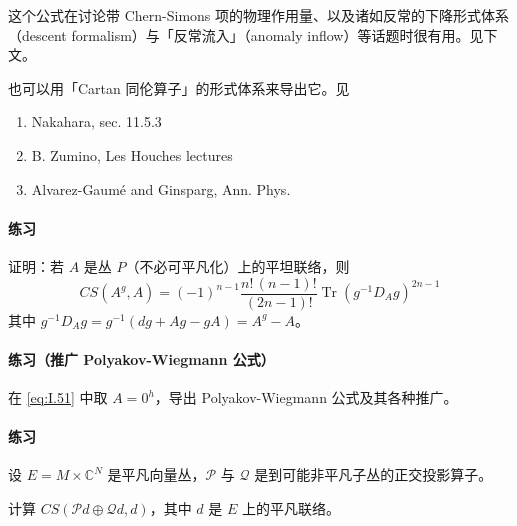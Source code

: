 
这个公式在讨论带 Chern-Simons 项的物理作用量、以及诸如反常的下降形式体系（descent formalism）与「反常流入」（anomaly inflow）等话题时很有用。见下文。

也可以用「Cartan 同伦算子」的形式体系来导出它。见

\begin{enumerate}
  \item Nakahara, sec. 11.5.3
  \item B. Zumino, Les Houches lectures
  \item Alvarez-Gaum\'e and Ginsparg, Ann. Phys.
\end{enumerate}

\paragraph{练习}
证明：若 $A$ 是丛 $P$（不必可平凡化）上的平坦联络，则
\begin{equation}
  CS(A^g,A) = (-1)^{n-1}\frac{n!\,(n-1)!}{(2n-1)!}\operatorname{Tr}(g^{-1}D_Ag)^{2n-1}
  \tag{I.54}
  \label{eq:I.54}
\end{equation}
其中 $g^{-1}D_Ag=g^{-1}(dg+Ag-gA)=A^g-A$。

\paragraph{练习（推广 Polyakov-Wiegmann 公式）}
在 \eqref{eq:I.51} 中取 $A=0^h$，导出 Polyakov-Wiegmann 公式及其各种推广。

\paragraph{练习}
设 $E=M\times\mathbb{C}^N$ 是平凡向量丛，$\mathcal{P}$ 与 $\mathcal{Q}$ 是到可能非平凡子丛的正交投影算子。

计算 $CS(\mathcal{P}d\oplus\mathcal{Q}d,d)$，其中 $d$ 是 $E$ 上的平凡联络。
